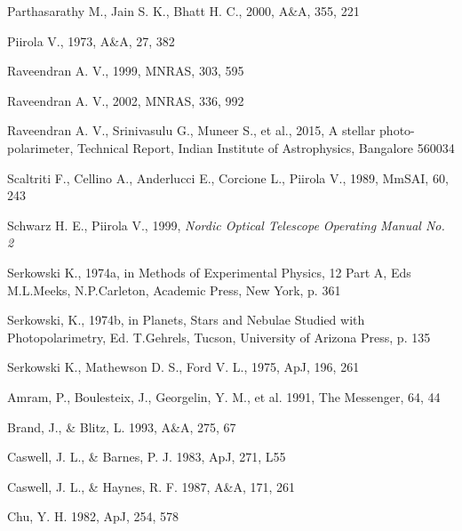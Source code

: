 {{{{{{{{{{{{{
        {Parthasarathy M., Jain S. K., Bhatt H. C., 2000, A\&A, 355, 221}

 {Piirola V., 1973, A\&A, 27, 382}

 {Raveendran A. V., 1999, MNRAS, 303, 595}

 {Raveendran A. V., 2002, MNRAS, 336, 992}

          {Raveendran A. V., Srinivasulu G., Muneer S., et al.,
           2015, A stellar photo-polarimeter, Technical Report, Indian Institute of Astrophysics, Bangalore 560034}

          {Scaltriti F., Cellino A., Anderlucci E., Corcione L., Piirola V., 1989, MmSAI, 60, 243}

          {Schwarz H. E., Piirola V., 1999, {\it Nordic Optical Telescope Operating Manual No. 2}}

         {Serkowski K., 1974a, in  Methods of Experimental Physics,  12 Part A, Eds M.L.Meeks, N.P.Carleton, Academic
           Press, New York, p. 361}

         {Serkowski, K., 1974b, in Planets, Stars and Nebulae
Studied with Photopolarimetry, Ed. T.Gehrels, Tucson, University of
Arizona Press, p. 135}

         {Serkowski K., Mathewson D. S., Ford V. L., 1975, ApJ, 196, 261}





 Amram, P., Boulesteix, J., Georgelin, Y. M., et al. 1991, The Messenger, 64, 44

 Brand, J., \& Blitz, L. 1993, A\&A, 275, 67

 Caswell, J. L., \& Barnes, P. J. 1983, ApJ, 271, L55

 Caswell, J. L., \& Haynes, R. F. 1987, A\&A, 171, 261

 Chu, Y. H. 1982, ApJ, 254, 578

}}}}}}}}}}}}}
